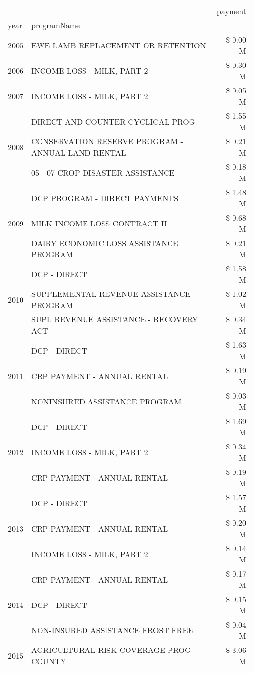 \begin{tabular}{llr}
\toprule
 &  & payment \\
year & programName &  \\
\midrule
2005 & EWE LAMB REPLACEMENT OR RETENTION & \$ 0.00 M \\
\cline{1-3}
2006 & INCOME LOSS - MILK, PART 2 & \$ 0.30 M \\
\cline{1-3}
2007 & INCOME LOSS - MILK, PART 2 & \$ 0.05 M \\
\cline{1-3}
\multirow[t]{3}{*}{2008} & DIRECT AND COUNTER CYCLICAL PROG & \$ 1.55 M \\
 & CONSERVATION RESERVE PROGRAM - ANNUAL LAND RENTAL & \$ 0.21 M \\
 & 05 - 07 CROP DISASTER ASSISTANCE & \$ 0.18 M \\
\cline{1-3}
\multirow[t]{3}{*}{2009} & DCP PROGRAM - DIRECT PAYMENTS & \$ 1.48 M \\
 & MILK INCOME LOSS CONTRACT II & \$ 0.68 M \\
 & DAIRY ECONOMIC LOSS ASSISTANCE PROGRAM & \$ 0.21 M \\
\cline{1-3}
\multirow[t]{3}{*}{2010} & DCP - DIRECT & \$ 1.58 M \\
 & SUPPLEMENTAL REVENUE ASSISTANCE PROGRAM & \$ 1.02 M \\
 & SUPL REVENUE ASSISTANCE - RECOVERY ACT & \$ 0.34 M \\
\cline{1-3}
\multirow[t]{3}{*}{2011} & DCP - DIRECT & \$ 1.63 M \\
 & CRP PAYMENT - ANNUAL RENTAL & \$ 0.19 M \\
 & NONINSURED ASSISTANCE PROGRAM & \$ 0.03 M \\
\cline{1-3}
\multirow[t]{3}{*}{2012} & DCP - DIRECT & \$ 1.69 M \\
 & INCOME LOSS - MILK, PART 2 & \$ 0.34 M \\
 & CRP PAYMENT - ANNUAL RENTAL & \$ 0.19 M \\
\cline{1-3}
\multirow[t]{3}{*}{2013} & DCP - DIRECT & \$ 1.57 M \\
 & CRP PAYMENT - ANNUAL RENTAL & \$ 0.20 M \\
 & INCOME LOSS - MILK, PART 2 & \$ 0.14 M \\
\cline{1-3}
\multirow[t]{3}{*}{2014} & CRP PAYMENT - ANNUAL RENTAL & \$ 0.17 M \\
 & DCP - DIRECT & \$ 0.15 M \\
 & NON-INSURED ASSISTANCE FROST FREE & \$ 0.04 M \\
\cline{1-3}
\multirow[t]{3}{*}{2015} & AGRICULTURAL RISK COVERAGE PROG - COUNTY & \$ 3.06 M \\

\end{tabular}
